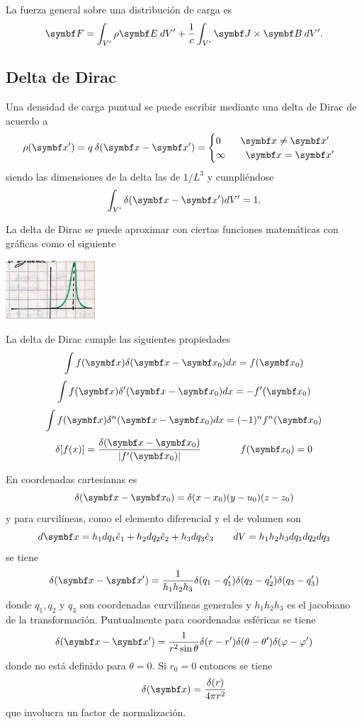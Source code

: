 \documentclass[10pt,oneside]{CBFT_book}
\begin{document}
La fuerza general sobre una distribución de carga es
\[
	\vb{F} = \int_{V'} \rho \vb{E} \: dV' + \frac{1}{c} \int_{V'} \vb{J} \times \vb{B} \: dV'. 
\]


\subsection{Delta de Dirac}

Una densidad de carga puntual se puede escribir mediante una delta de Dirac de acuerdo a
\[
	\rho(\vb{x}') = q\: \delta (\vb{x} - \vb{x}') = \begin{cases}
	                                               0 \qquad \vb{x} \neq \vb{x}' \\
	                                               \infty \qquad \vb{x} = \vb{x}'\\
	                                              \end{cases}
\]
siendo las dimensiones de la delta las de $1/L^3$ y cumpliéndose 
\[
	\int_{V'} \delta (\vb{x} - \vb{x}') dV' = 1.
\]

La delta de Dirac se puede aproximar con ciertas funciones matemáticas con gráficas como el 
siguiente 

\includegraphics[width=0.25\textwidth]{images/fig_ft1_delta_dirac.jpg}

La delta de Dirac cumple las siguientes propiedades
\[
	\int f(\vb{x}) \delta(\vb{x} - \vb{x}_0) dx = f(\vb{x}_0)
\]
\[
	\int f(\vb{x}) \delta' (\vb{x} - \vb{x}_0) dx = -f'(\vb{x}_0)
\]
\[
	\int f(\vb{x}) \delta^n (\vb{x} - \vb{x}_0) dx = (-1)^n f^n(\vb{x}_0)
\]
\[
	\delta[f(x)] = \frac{\delta(\vb{x}-\vb{x}_0)}{|f'(\vb{x}_0)|} \qquad \qquad f(\vb{x}_0) = 0
\]

En coordenadas cartesianas es
\[
	\delta(\vb{x}-\vb{x}_0) = \delta(x-x_0)(y-u_0)(z-z_0)
\]
y para curvilíneas, como el elemento diferencial y el de volumen son  
\[
	d\vb{x} = h_1 dq_1 \hat{e}_1 + h_2 dq_2 \hat{e}_2 + h_3 dq_3 \hat{e}_3 
	\qquad 	dV = h_1 h_2 h_3 dq_1 dq_2 dq_3
\]
se tiene
\[
	\delta (\vb{x} - \vb{x}') = \frac{1}{h_1h_2h_3} \delta(q_1-q_1') \delta(q_2-q_2') \delta(q_3-q_3')
\]
donde $q_1, q_2$ y $q_3$ son coordenadas curvilíneas generales y $h_1h_2h_3$ es el jacobiano
de la transformación.
Puntualmente para coordenadas esféricas se tiene 
\[
	\delta (\vb{x} - \vb{x}') = \frac{1}{r^2 \sin\theta} 
	\delta(r-r') \delta(\theta-\theta') \delta(\varphi-\varphi')
\]
donde no está definido para $\theta=0$. Si $r_0=0$ entonces se tiene 
\[
	\delta(\vb{x}) = \frac{\delta(r)}{4\pi r^2}
\]
que involucra un factor de normalización.
\end{document}
